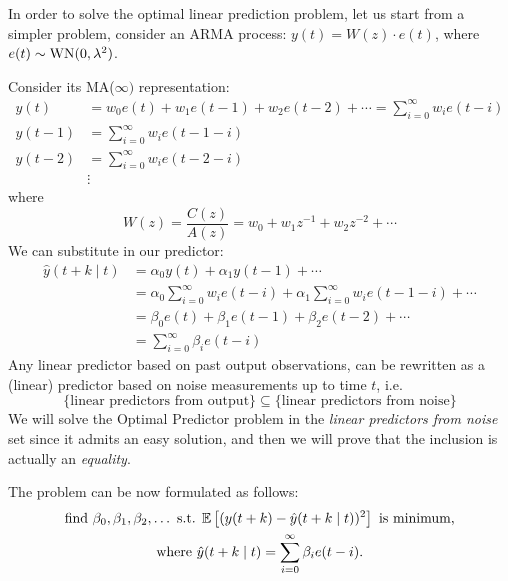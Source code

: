 
In order to solve the optimal linear prediction problem, let us start from a simpler problem, consider an ARMA process: $y(t)=W(z) \cdot e(t)$, where $e(t) \sim \operatorname{WN}(0, \lambda^{2})$.

Consider its MA($\infty)$ representation:
\begin{align*}
	y(t)&=w_{0} e(t)+w_{1} e(t-1)+w_{2} e(t-2)+\cdots=\sum_{i=0}^{\infty} w_{i} e(t-i)\\
	y(t-1)&=\sum_{i=0}^{\infty} w_{i} e(t-1-i)\\
	y(t-2)&=\sum_{i=0}^{\infty} w_{i} e(t-2-i)\\
	&\vdots
\end{align*}
where
\[
	W(z)=\frac{C(z)}{A(z)}=w_{0}+w_{1} z^{-1}+w_{2} z^{-2}+\cdots
\]
We can substitute in our predictor:
\begin{align*}
	\hat{y}(t+k \mid t) &=\alpha_{0} y(t)+\alpha_{1} y(t-1)+\cdots \\
	&=\alpha_{0} \sum_{i=0}^{\infty} w_{i} e(t-i)+\alpha_{1} \sum_{i=0}^{\infty} w_{i} e(t-1-i)+\cdots \\
	&=\beta_{0} e(t)+\beta_{1} e(t-1)+\beta_{2} e(t-2)+\cdots\\
	&=\sum_{i=0}^{\infty} \beta_{i} e(t-i)
\end{align*}
Any linear predictor based on past output observations, can be rewritten as a (linear) predictor based on noise measurements up to time $t$, i.e.
\[
	\{\text{linear predictors from output}\} \subseteq \{\text{linear predictors from noise}\}
\]
We will solve the Optimal Predictor problem in the \emph{linear predictors from noise} set since it admits an easy solution, and then we will prove that the inclusion is actually an \emph{equality}.

The problem can be now formulated as follows:
\begin{gather*}
	\text{find } \beta_{0}, \beta_{1}, \beta_{2}, \ldots \text{ s.t. } \mathbb{E}\left[(y(t+k)-\hat{y}(t+k \mid t))^{2}\right] \text{ is minimum,}\\
	\text{where } \hat{y}(t+k \mid t) = \sum_{i=0}^{\infty} \beta_{i} e(t-i).
\end{gather*}


